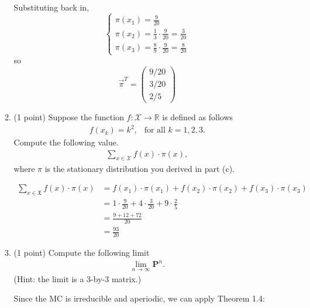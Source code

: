 \documentclass[11pt,letterpaper, leqno]{article}
\numberwithin{equation}{section}
\numberwithin{theorem}{section}
\numberwithin{lemma}{section}
\numberwithin{corollary}{section}
\numberwithin{definition}{section}
\numberwithin{proposition}{section}
\numberwithin{remark}{section}
\numberwithin{example}{section}
\newcommand{\mfX}{\mathfrak{X}}
\begin{document}
\begin{enumerate}
\begin{enumerate}
                Substituting back in, 
                \[\begin{cases}
                    \pi(x_1) = \frac{9}{20}\\
                    \pi(x_2) = \frac{1}{3}\cdot \frac{9}{20} = \frac{3}{20}\\
                    \pi(x_3) = \frac{8}{9}\cdot \frac{9}{20} = \frac{8}{20}
                \end{cases}\]
                so 
                \[\boxed{\vec \pi^T = \begin{pmatrix}
                    9/20\\
                    3/20\\
                    2/5
                \end{pmatrix}}\]
            \color{black}   
        
        \item (1 point) Suppose the function $f:\mathcal{X}\rightarrow\mathbb{R}$ is defined as follows
        \begin{align*}
            f(x_k)=k^2,\ \ \mbox{ for all }k=1,2,3.
        \end{align*}
        Compute the following value.
        \begin{align*}
            \sum_{x\in\mathcal{X}}f(x)\cdot\pi(x),
        \end{align*}
        where $\pi$ is the stationary distribution you derived in part (c).
        
            \color{blue}
                \begin{align*}
                    \sum_{x\in \mfX} f(x) \cdot \pi(x) &= f(x_1) \cdot \pi(x_1) + f(x_2) \cdot \pi(x_2) + f(x_3) \cdot \pi(x_3)\\
                        &= 1 \cdot \frac{9}{20} + 4\cdot \frac{3}{20} + 9\cdot \frac{2}{5}\\
                        &= \frac{9 + 12 + 72}{20}\\
                        &= \boxed{\frac{93}{20}}
                \end{align*}
            \color{black}

        \item (1 point) Compute the following limit
        \begin{align*}
            \lim_{n\rightarrow\infty} \boldsymbol{P}^n.
        \end{align*}
        (Hint: the limit is a 3-by-3 matrix.)

            \color{blue}
                Since the MC is irreducible and aperiodic, we can apply Theorem 1.4:


\end{enumerate}
\end{enumerate}
\end{document}
